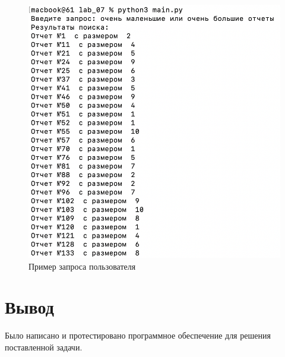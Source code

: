 \begin{figure}[!h]
            \centering
            \includegraphics[scale=0.6]{img/3.png}
            \caption{Пример запроса пользователя}
            \label{graph:test:3}
        \end{figure}
        \newpage

    \section*{Вывод}
	
	Было написано и протестировано программное обеспечение для решения поставленной задачи.
    	
\newpage